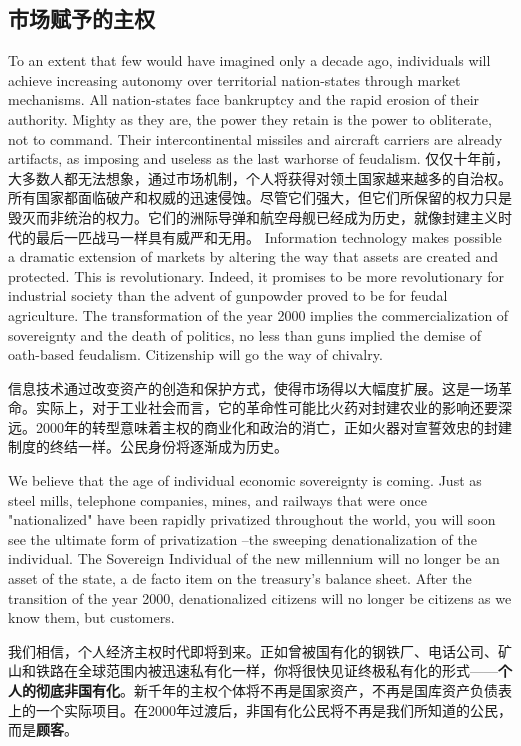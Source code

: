 \subsection{市场赋予的主权}
\begin{paracol}{2}[]
To an extent that few would have imagined only a decade ago, individuals will achieve increasing autonomy over territorial nation-states through market mechanisms. All nation-states face bankruptcy and the rapid erosion of their authority. Mighty as they are, the power they retain is the power to obliterate, not to command. Their intercontinental missiles and aircraft carriers are already artifacts, as imposing and useless as the last warhorse of feudalism.
\switchcolumn
仅仅十年前，大多数人都无法想象，通过市场机制，个人将获得对领土国家越来越多的自治权。所有国家都面临破产和权威的迅速侵蚀。尽管它们强大，但它们所保留的权力只是毁灭而非统治的权力。它们的洲际导弹和航空母舰已经成为历史，就像封建主义时代的最后一匹战马一样具有威严和无用。
\switchcolumn*
Information technology makes possible a dramatic extension of markets by altering the way that assets are created and protected. This is revolutionary. Indeed, it promises to be more revolutionary for industrial society than the advent of gunpowder proved to be for feudal agriculture. The transformation of the year 2000 implies the commercialization of sovereignty and the death of politics, no less than guns implied the demise of oath-based feudalism. Citizenship will go the way of chivalry.

\switchcolumn
信息技术通过改变资产的创造和保护方式，使得市场得以大幅度扩展。这是一场革命。实际上，对于工业社会而言，它的革命性可能比火药对封建农业的影响还要深远。2000年的转型意味着主权的商业化和政治的消亡，正如火器对宣誓效忠的封建制度的终结一样。公民身份将逐渐成为历史。

\switchcolumn*
We believe that the age of individual economic sovereignty is coming. Just as steel mills, telephone companies, mines, and railways that were once "nationalized" have been rapidly privatized throughout the world, you will soon see the ultimate form of privatization --the sweeping denationalization of the individual. The Sovereign Individual of the new millennium will no longer be an asset of the state, a de facto item on the treasury's balance sheet. After the transition of the year 2000, denationalized citizens will no longer be citizens as we know them, but customers.

\switchcolumn
我们相信，个人经济主权时代即将到来。正如曾被国有化的钢铁厂、电话公司、矿山和铁路在全球范围内被迅速私有化一样，你将很快见证终极私有化的形式——\textbf{个人的彻底非国有化}。新千年的主权个体将不再是国家资产，不再是国库资产负债表上的一个实际项目。在2000年过渡后，非国有化公民将不再是我们所知道的公民，而是\textbf{顾客}。
\end{paracol}

